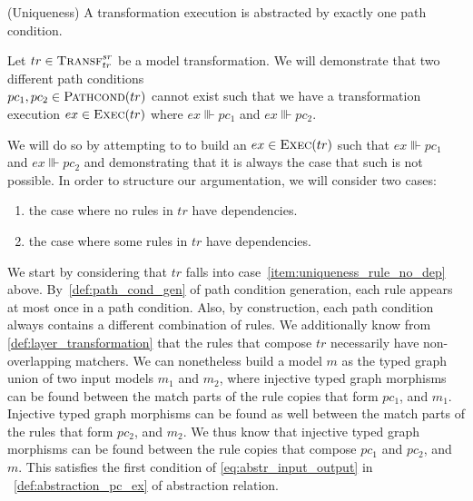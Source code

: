 \begin{lemma} (Uniqueness) 
\label{lem:uniqueness}
A transformation execution is abstracted by exactly one path condition.
\end{lemma}
\begin{ps}
Let $tr\in \textsc{Transf}^{sr}_{tr}$ be a model transformation. We will demonstrate that two different path conditions\\$pc_1, pc_2\in \textsc{Pathcond}(tr)$ cannot exist such that we have a transformation execution $ex\in \textsc{Exec}(tr)$ where $ex\Vvdash pc_1$ and $ex\Vvdash pc_2$.

We will do so by attempting to to build an $ex\in \textsc{Exec}(tr)$ such that $ex\Vvdash pc_1$ and $ex\Vvdash pc_2$ and demonstrating that it is always the case that such is not possible. In order to structure our argumentation, we will consider two cases:
\begin{enumerate}
  \item\label{item:uniqueness_rule_no_dep} the case where no rules in $tr$ have dependencies.
  \item\label{item:uniqueness_rule_has_dep} the case where some rules in $tr$ have dependencies.
\end{enumerate}

We start by considering that $tr$ falls into case~\ref{item:uniqueness_rule_no_dep} above. By~\cref{def:path_cond_gen} of path condition generation, each rule appears at most once in a path condition. Also, by construction, each path condition always contains a different combination of rules. We additionally know from \cref{def:layer_transformation} that the rules that compose $tr$ necessarily have non-overlapping matchers. We can nonetheless build a model $m$ as the typed graph union of two input models $m_1$ and $m_2$, where injective typed graph morphisms can be found between the match parts of the rule copies that form $pc_1$, and $m_1$. Injective typed graph morphisms can be found as well between the match parts of the rules that form $pc_2$, and $m_2$. We thus know that injective typed graph morphisms can be found between the rule copies that compose $pc_1$ and $pc_2$, and $m$. This satisfies the first condition of \cref{eq:abstr_input_output} in ~\cref{def:abstraction_pc_ex} of abstraction relation. 


\end{ps}
